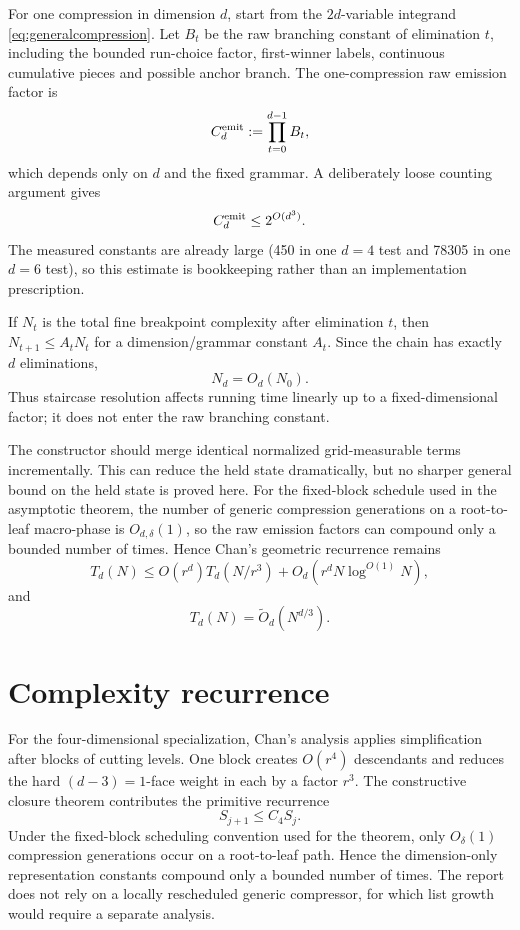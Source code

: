 \documentclass[12pt,a4paper]{article}
\theoremstyle{definition}
\newcommand{\1}{\mathbf 1}
\begin{document}
For one compression in dimension $d$, start from the $2d$-variable integrand \eqref{eq:generalcompression}. Let $B_t$ be the raw branching constant of elimination $t$, including the bounded run-choice factor, first-winner labels, continuous cumulative pieces and possible anchor branch. The one-compression raw emission factor is
\[
C_d^{\rm emit}:=\prod_{t=0}^{d-1}B_t,
\]
which depends only on $d$ and the fixed grammar. A deliberately loose counting argument gives
\[
C_d^{\rm emit}\le2^{O(d^3)}.
\]
The measured constants are already large (450 in one $d=4$ test and 78305 in one $d=6$ test), so this estimate is bookkeeping rather than an implementation prescription.

If $N_t$ is the total fine breakpoint complexity after elimination $t$, then $N_{t+1}\le A_tN_t$ for a dimension/grammar constant $A_t$. Since the chain has exactly $d$ eliminations,
\[
N_d=O_d(N_0).
\]
Thus staircase resolution affects running time linearly up to a fixed-dimensional factor; it does not enter the raw branching constant.

The constructor should merge identical normalized grid-measurable terms incrementally. This can reduce the held state dramatically, but no sharper general bound on the held state is proved here. For the fixed-block schedule used in the asymptotic theorem, the number of generic compression generations on a root-to-leaf macro-phase is $O_{d,\delta}(1)$, so the raw emission factors can compound only a bounded number of times. Hence Chan's geometric recurrence remains
\[
T_d(N)\le O(r^d)T_d(N/r^3)+O_d(r^dN\log^{O(1)}N),
\]
and
\[
T_d(N)=\widetilde O_d(N^{d/3}).
\]

\section{Complexity recurrence}                                   \label{app:recurrence}

For the four-dimensional specialization, Chan's analysis applies simplification after blocks of cutting levels.  One block creates $O(r^4)$ descendants and reduces the hard $(d-3)=1$-face weight in each by a factor $r^3$.  The constructive closure theorem contributes the primitive recurrence
\[
S_{j+1}\le C_4S_j.
\]
Under the fixed-block scheduling convention used for the theorem, only $O_{\delta}(1)$ compression generations occur on a root-to-leaf path.  Hence the dimension-only representation constants compound only a bounded number of times.  The report does not rely on a locally rescheduled generic compressor, for which list growth would require a separate analysis.
\end{document}
